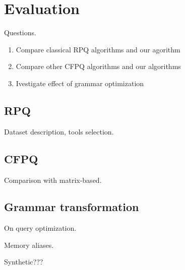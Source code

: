 \section{Evaluation}

Questions.
\begin{enumerate}
	\item Compare classical RPQ algorithms and our agorithm
	\item Compare other CFPQ algorithms and our algorithms
	\item Ivestigate effect of grammar optimization
\end{enumerate}

\subsection{RPQ}

Dataset description, tools selection.

\subsection{CFPQ}

Comparison with matrix-based.

\subsection{Grammar transformation}

On query optimization.

Memory aliases.

Synthetic???